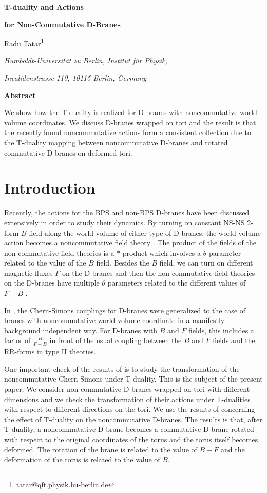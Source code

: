 \documentclass[a4paper,12pt]{article}
\begin{document}
\begin{titlepage}
\vskip 3cm
\centerline{\Large\bf{T-duality and  Actions}} 
\centerline{\Large\bf{for Non-Commutative D-Branes}}
\vskip 1cm
\centerline{Radu Tatar\footnote{tatar@qft.physik.hu-berlin.de}}
\bigskip
\centerline{\it Humboldt-Universit\"at zu Berlin, Institut f\"ur  
Physik,}
\centerline{\it Invalidenstrasse 110, 10115 Berlin, Germany}
\smallskip
\vskip 4cm
\centerline{\bf Abstract}
We show how the T-duality is realized for D-branes with 
noncommutative world-volume coordinates. We discuss D-branes wrapped on 
tori and the result is that
the recently found noncommutative actions form a 
consistent collection due to the T-duality mapping between 
noncommutative D-branes and rotated commutative D-branes on deformed tori. 
\bigskip
\end{titlepage}
\section{Introduction}
Recently, the actions for the BPS and non-BPS D-branes have been discussed
extensively in order to study their dynamics. By turning on constant
NS-NS 2-form $B$-field along the world-volume of either type of  D-branes, 
the world-volume
action becomes a noncommutative field theory \cite{sch,sw,gms,dmr,kra2,gms1,
sei,kra3,sen1,gms2,kra4}. 
The product of the fields of the non-commutative field theories is a
$*$ product which involves a $\theta$ parameter related to the value of the
$B$ field.
Besides the $B$ field, 
we can turn on different magnetic fluxes $F$ on the D-branes and then the
non-commutative field theories on the D-branes have multiple 
$\theta$ parameters related to the different values of $F + B$ 
\cite{ot5,nappi,dasy}.

In \cite{ms}, the Chern-Simons couplings for D-branes were generalized to 
the case of branes with noncommutative world-volume coordinate in a manifestly
background independent way. For D-branes with $B$ and $F$ fields, this 
includes a factor of $\frac{B}{F+B}$ in front of the usual coupling between 
the $B$ and $F$ fields and the RR-forms in type II theories. 

One important check of the results of \cite{ms} is to study the transformation
of the noncommutative Chern-Simons under T-duality.  
This is the subject of the present paper. We consider non-commutative 
D-branes wrapped on tori with different dimensions and we check the 
transformation of their actions under
T-dualities with respect to different directions on the tori. 
We use the results of \cite{chu,chen,ima,blu1,blu2,blu3} 
concerning the effect of
T-duality on the noncommutative D-branes. 
The results is that, after T-duality, a 
noncommutative D-brane becomes a commutative D-brane rotated with respect to
the original coordinates of the torus and the torus itself becomes deformed.
The rotation of the brane is related to the value of $B + F$ and the 
deformation of the torus is related to the value of $B$.  
\end{document}
